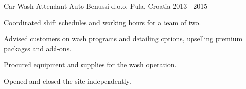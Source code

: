 \begin{cventries}
  \cventry
    {Car Wash Attendant} %
    {Auto Benussi d.o.o.} %
    {Pula, Croatia} %
    {2013 - 2015} %
    {
      \begin{cvitems} %
        \item {Coordinated shift schedules and working hours for a team of two.}
        \item {Advised customers on wash programs and detailing options, upselling premium packages and add-ons.}
        \item {Procured equipment and supplies for the wash operation.}
        \item {Opened and closed the site independently.}
      \end{cvitems}
    }

\end{cventries}
